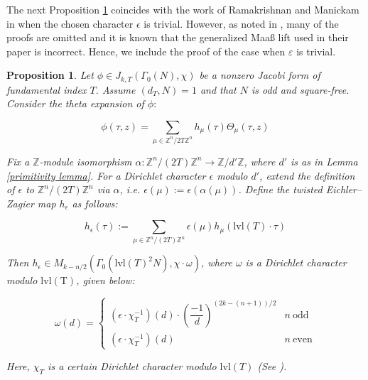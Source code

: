 \documentclass[11pt]{article}
\newtheorem{proposition}[theorem]{Proposition}
\theoremstyle{definition}
\theoremstyle{remark}
\newcommand{\Z}{\mathbb{Z}}
\begin{document}
The next Proposition \ref{twisted EZ} coincides with the work of Ramakrishnan and Manickam in \cite{RM} when the chosen character $\epsilon$ is trivial. However, as noted in \cite{BA}, many of the proofs are omitted and it is known that the generalized Maaß lift used in their paper is incorrect. Hence, we include the proof of the case when $\varepsilon$ is trivial.

\begin{proposition} \label{twisted EZ}
    Let $\phi \in J_{k,T}(\Gamma_0(N),\chi)$ be a nonzero Jacobi form of fundamental index $T$. Assume $(d_T,N) = 1$ and that $N$ is odd and square-free. Consider the theta expansion of $\phi:$

    \[
    \phi(\tau,z) = \sum_{\mu \in \Z^n/2T\Z^n} h_\mu(\tau) \Theta_\mu(\tau,z)
    \]

    Fix a $\Z$-module isomorphism $\alpha:\Z^n/(2T)\Z^n \to \Z/d'\Z$, where $d'$ is as in Lemma \ref{primitivity lemma}. For a Dirichlet character $\epsilon$ modulo $d'$, extend the definition of $\epsilon$ to $\Z^n/(2T)\Z^n$ via $\alpha$, i.e. $\epsilon(\mu):=\epsilon(\alpha(\mu))$. Define the \textit{twisted} Eichler--Zagier map $h_\epsilon$ as follows: 

    \[
    h_\epsilon(\tau) := \sum_{\mu \in \Z^n/(2T)\Z^n} \epsilon(\mu) h_\mu(\mathrm{lvl}(T) \cdot \tau)
    \]

    Then $h_\epsilon \in M_{k-n/2}(\Gamma_0(\mathrm{lvl}(T)^2N), \chi \cdot \omega)$, where $\omega$ is a Dirichlet character modulo $\mathrm{lvl(T)}$, given below:
    
    \[\omega(d) = 
    \begin{cases}
        (\epsilon\cdot\chi_T^{-1})(d)\cdot\left(\dfrac{-1}{d} \right)^{(2k-(n+1))/2} & n \ \mathrm{odd} \\ 
        (\epsilon\cdot\chi_T^{-1})(d) & n \ \mathrm{even}
    \end{cases}
    \]
    
    Here, $\chi_T$ is a certain Dirichlet character modulo $\mathrm{lvl}(T)$ (See \cite{Ajouz}).
\end{proposition}
\end{document}
